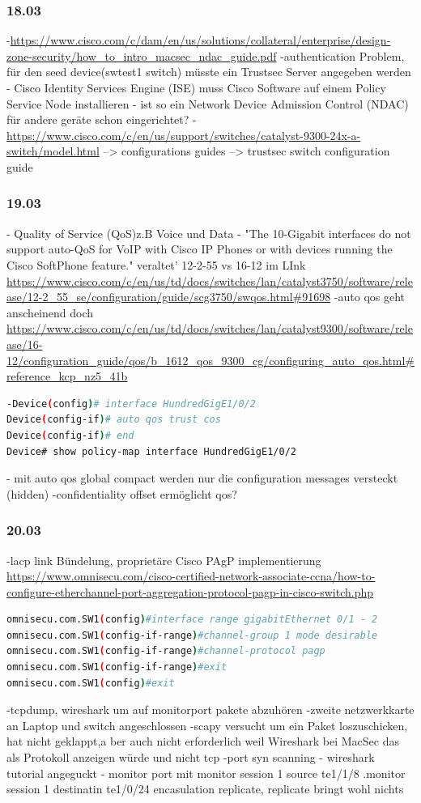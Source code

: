 \documentclass[english,runningheads,a4paper]{llncs}[2018/03/10]
\begin{document}
\subsubsection{18.03}
-\url{https://www.cisco.com/c/dam/en/us/solutions/collateral/enterprise/design-zone-security/how_to_intro_macsec_ndac_guide.pdf}
-authentication Problem, für den seed device(swtest1 switch) müsste ein Trustsec Server angegeben werden
- Cisco Identity Services Engine (ISE) muss Cisco Software auf einem Policy Service Node installieren
- ist so ein Network Device Admission Control (NDAC) für andere geräte schon eingerichtet?
-\url{https://www.cisco.com/c/en/us/support/switches/catalyst-9300-24x-a-switch/model.html} --> configurations guides --> trustsec switch configuration guide

\subsubsection{19.03}
- Quality of Service (QoS)z.B Voice und Data
- "The 10-Gigabit interfaces do not support auto-QoS for VoIP with Cisco IP Phones or with devices running the Cisco SoftPhone feature." veraltet' 12-2-55 vs 16-12 im LInk
\url{https://www.cisco.com/c/en/us/td/docs/switches/lan/catalyst3750/software/release/12-2_55_se/configuration/guide/scg3750/swqos.html#91698}
-auto qos geht anscheinend doch
\url{https://www.cisco.com/c/en/us/td/docs/switches/lan/catalyst9300/software/release/16-12/configuration_guide/qos/b_1612_qos_9300_cg/configuring_auto_qos.html#reference_kcp_nz5_41b}
\begin{lstlisting}[language=bash]
-Device(config)# interface HundredGigE1/0/2
Device(config-if)# auto qos trust cos
Device(config-if)# end
Device# show policy-map interface HundredGigE1/0/2
\end{lstlisting}
- mit auto qos global compact werden nur die configuration  messages versteckt (hidden)
-confidentiality offset ermöglicht qos?
\subsubsection{20.03}
-lacp link Bündelung, proprietäre Cisco PAgP implementierung
\url{https://www.omnisecu.com/cisco-certified-network-associate-ccna/how-to-configure-etherchannel-port-aggregation-protocol-pagp-in-cisco-switch.php}
\begin{lstlisting}[language=bash]
omnisecu.com.SW1(config)#interface range gigabitEthernet 0/1 - 2
omnisecu.com.SW1(config-if-range)#channel-group 1 mode desirable
omnisecu.com.SW1(config-if-range)#channel-protocol pagp 
omnisecu.com.SW1(config-if-range)#exit
omnisecu.com.SW1(config)#exit
\end{lstlisting}
-tcpdump, wireshark um auf monitorport pakete abzuhören
-zweite netzwerkkarte an Laptop und switch angeschlossen
-scapy versucht um ein Paket loszuschicken, hat nicht geklappt,a ber auch nicht erforderlich weil Wireshark bei MacSec das als Protokoll anzeigen würde und nicht tcp
-port syn scanning
- wireshark tutorial angeguckt
- monitor port mit monitor session 1 source te1/1/8
.monitor session 1 destinatin te1/0/24 encasulation replicate, replicate bringt wohl nichts
\end{document}
